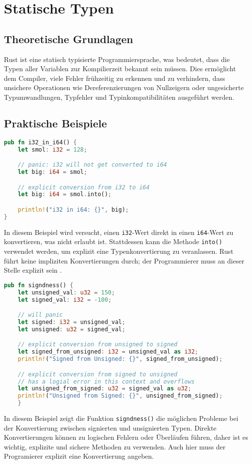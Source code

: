 
\chapter{Statische Typen}

\section{Theoretische Grundlagen}

Rust ist eine statisch typisierte Programmiersprache, was bedeutet, dass die Typen aller Variablen zur Kompilierzeit bekannt sein müssen. 
Dies ermöglicht dem Compiler, viele Fehler frühzeitig zu erkennen und zu verhindern, dass unsichere Operationen wie Dereferenzierungen von Nullzeigern oder ungesicherte Typumwandlungen, Typfehler und Typinkompatibilitäten ausgeführt werden. 

\section{Praktische Beispiele}

\begin{lstlisting}[language=Rust, caption={i32 in i64}]
pub fn i32_in_i64() {
    let smol: i32 = 128;

    // panic: i32 will not get converted to i64
    let big: i64 = smol;

    // explicit conversion from i32 to i64 
    let big: i64 = smol.into();

    println!("i32 in i64: {}", big);
}
\end{lstlisting}

\noindent
In diesem Beispiel wird versucht, einen \texttt{i32}-Wert direkt in einen \texttt{i64}-Wert zu konvertieren, was nicht erlaubt ist. 
Stattdessen kann die Methode \texttt{into()} verwendet werden, um explizit eine Typenkonvertierung zu veranlassen. 
Rust führt keine impliziten Konvertierungen durch; der Programmierer muss an dieser Stelle explizit sein \cite[Kapitel 1. Types]{drysdale2024}.

\begin{lstlisting}[language=Rust, caption={Signiertheit}]
pub fn signdness() {
    let unsigned_val: u32 = 150;
    let signed_val: i32 = -100;

    // will panic 
    let signed: i32 = unsigned_val;
    let unsigned: u32 = signed_val;

    // explicit conversion from unsigned to signed
    let signed_from_unsigned: i32 = unsigned_val as i32;
    println!("Signed from Unsigned: {}", signed_from_unsigned);

    // explicit conversion from signed to unsigned
    // has a logial error in this context and overflows
    let unsigned_from_signed: u32 = signed_val as u32;
    println!("Unsigned from Signed: {}", unsigned_from_signed); 
    }
\end{lstlisting}
\noindent
In diesem Beispiel zeigt die Funktion \texttt{signdness()} die möglichen Probleme bei der Konvertierung zwischen signierten und unsignierten Typen. 
Direkte Konvertierungen können zu logischen Fehlern oder Überläufen führen, daher ist es wichtig, explizite und sichere Methoden zu verwenden.
Auch hier muss der Programierer explizit eine Konvertierung angeben.

